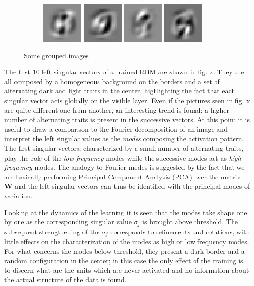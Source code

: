 \documentclass[twocolumn]{article}
\begin{document}
\begin{figure}
\begin{subfigure}{\linewidth}
    \includegraphics[width=.1\linewidth]{X_l_eigv_7.eps}
    \includegraphics[width=.1\linewidth]{X_l_eigv_8.eps}
    \includegraphics[width=.1\linewidth]{X_l_eigv_9.eps}
    \includegraphics[width=.1\linewidth]{X_l_eigv_10.eps}
    \caption{}
  \end{subfigure}
 \caption{Some grouped images}
\end{figure}

The first 10 left singular vectors of a trained RBM are shown in fig. x. They are all composed by a homogeneous background on the borders and a set of alternating dark and light traits in the center, highlighting the fact that each singular vector acts globally on the visible layer. Even if the pictures seen in fig. x are quite different one from another, an interesting trend is found: a higher number of alternating traits is present in the successive vectors. At this point it is useful to draw a comparison to the Fourier decomposition of an image and interpret the left singular values as the \textit{modes} composing the activation pattern. The first singular vectors, characterized by a small number of alternating traits, play the role of the \textit{low frequency} modes while the successive modes act as \textit{high frequency} modes. The analogy to Fourier modes is suggested by the fact that we are basically performing Principal Component Analysis (PCA) over the matrix \textbf{W} and the left singular vectors can thus be identified with the principal modes of variation.

Looking at the dynamics of the learning it is seen that the modes take shape one by one as the corresponding singular value \(\sigma_j\) is brought above threshold. The subsequent strengthening of the \(\sigma_j\) corresponds to refinements and rotations, with little effects on the characterization of the modes as high or low frequency modes. For what concerns the modes below threshold, they present a dark border and a random configuration in the center; in this case the only effect of the training is to discern what are the units which are never activated and no information about the actual structure of the data is found.
\end{document}
